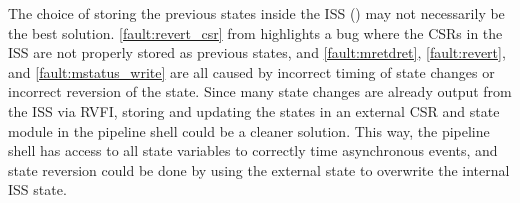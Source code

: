 The choice of storing the previous states inside the ISS () may not necessarily be the best solution. \ref{fault:revert_csr} from  highlights a bug where the CSRs in the ISS are not properly stored as previous states, and \ref{fault:mretdret},  \ref{fault:revert}, and \ref{fault:mstatus_write} are all caused by incorrect timing of state changes or incorrect reversion of the state. Since many state changes are already output from the ISS via RVFI, storing and updating the states in an external CSR and state module in the pipeline shell could be a cleaner solution. This way, the pipeline shell has access to all state variables to correctly time asynchronous events, and state reversion could be done by using the external state to overwrite the internal ISS state. 
